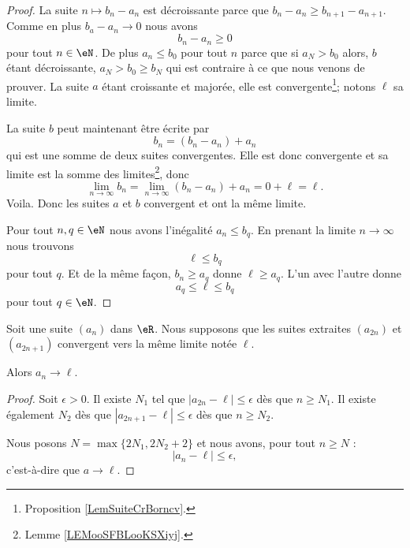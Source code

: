 \begin{proof}
    La suite \( n\mapsto b_n-a_n\) est décroissante parce que \( b_n-a_n\geq b_{n+1}-a_{n+1}\). Comme en plus \( b_a-a_n\to 0\) nous avons
    \begin{equation}
        b_n-a_n\geq 0
    \end{equation}
    pour tout \( n\in \eN\). De plus \( a_n\leq b_0\) pour tout \( n\) parce que si \( a_N>b_0\) alors, \( b\) étant décroissante, \( a_N>b_0\geq b_N\) qui est contraire à ce que nous venons de prouver. La suite \( a\) étant croissante et majorée, elle est convergente\footnote{Proposition \ref{LemSuiteCrBorncv}.}; notons \( \ell\) sa limite.

    La suite \( b\) peut maintenant être écrite par
    \begin{equation}
        b_n=(b_n-a_n)+a_n
    \end{equation}
    qui est une somme de deux suites convergentes. Elle est donc convergente et sa limite est la somme des limites\footnote{Lemme \ref{LEMooSFBLooKSXiyj}.}, donc
    \begin{equation}
        \lim_{n\to \infty} b_n=\lim_{n\to \infty} (b_n-a_n)+a_n=0+\ell=\ell.
    \end{equation}
    Voila. Donc les suites \( a\) et \( b\) convergent et ont la même limite.

    Pour tout \( n,q\in \eN\) nous avons l'inégalité \( a_n\leq b_q\). En prenant la limite \( n\to \infty\) nous trouvons
    \begin{equation}
        \ell\leq b_q
    \end{equation}
    pour tout \( q\). Et de la même façon, \( b_n\geq a_q\) donne \( \ell\geq a_q\). L'un avec l'autre donne
    \begin{equation}
        a_q\leq \ell\leq b_q
    \end{equation}
    pour tout \( q\in \eN\).
\end{proof}

\begin{proposition}      \label{PROPooXOOCooGMqJNe}
    Soit une suite \( (a_n)\) dans \( \eR\).  Nous supposons que les suites extraites \( (a_{2n})\) et \( (a_{2n+1})\) convergent vers la même limite notée \( \ell\).

    Alors \( a_n\to \ell\).
\end{proposition}

\begin{proof}
    Soit \( \epsilon>0\). Il existe \( N_1\) tel que \( | a_{2n}-\ell |\leq \epsilon\) dès que \( n\geq N_1\). Il existe également \( N_2\) dès que \( | a_{2n+1}-\ell |\leq \epsilon\) dès que \( n\geq N_2\).

    Nous posons \( N=\max\{ 2N_1,2N_2+2 \}\) et nous avons, pour tout \( n\geq N\) :
    \begin{equation}
        | a_n-\ell |\leq \epsilon,
    \end{equation}
    c'est-à-dire que \( a\to \ell\).
\end{proof}


